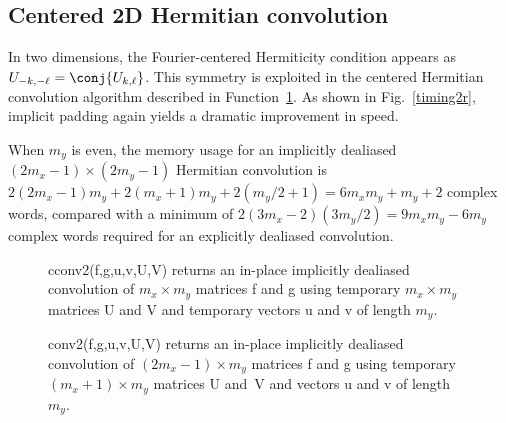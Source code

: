\documentclass[final]{siamltex}
\begin{document}
\subsection{Centered 2D Hermitian convolution}

In two dimensions, the Fourier-centered Hermiticity condition appears as
$U_{-k,-\ell}=\conj{U_{k,\ell}}$. 
This symmetry is exploited in the centered Hermitian convolution
algorithm described in Function~{\tt\ref{conv2}}. As shown in
Fig.~\ref{timing2r}, implicit padding again yields a dramatic improvement
in speed.

When $m_y$ is even, the memory usage for an implicitly dealiased
$(2m_x-1)\times (2m_y-1)$ Hermitian convolution is
$2(2m_x-1)m_y+2(m_x+1)m_y+2(m_y/2+1)=6m_xm_y+m_y+2$ complex words, compared
with a minimum of $2(3m_x-2)(3m_y/2)=9m_xm_y-6m_y$ complex words required
for an explicitly dealiased convolution.

\begin{figure}[htbp]
\begin{minipage}{0.5\linewidth}
\begin{function}[H]
  \Return \xf\;
\caption{cconv2({\sf f},{\sf g},{\sf u},{\sf v},{\sf U},{\sf V}) 
returns an in-place implicitly dealiased convolution of
\hbox{$m_x\times m_y$} matrices {\sf f} and {\sf g} using temporary 
\hbox{$m_x\times m_y$}
matrices {\sf U} and {\sf V} and temporary vectors {\sf u} and {\sf v} of
length $m_y$.}\label{cconv2}
\end{function}
\end{minipage}
%
\begin{minipage}{0.5\linewidth}
\begin{function}[H]
  \Return \xf\;
\caption{conv2({\sf f},{\sf g},{\sf u},{\sf v},{\sf U},{\sf V}) 
returns an in-place implicitly dealiased convolution of $(2m_x-1)\times
m_y$ matrices {\sf f} and {\sf g} using temporary $(m_x+1)\times m_y$ matrices 
{\sf U} and~{\sf V} and vectors {\sf u} and {\sf v} of length~$m_y$.
}\label{conv2}
\end{function}
\end{minipage}
\end{figure}
\end{document}

